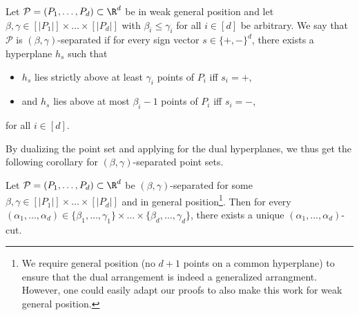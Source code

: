 %
\begin{definition}
    Let $\mathcal{P} = (P_1, \dots, P_d ) \subset \R^d$ be in weak general position and let $\beta, \gamma \in [|P_1|] \times \dots \times [|P_d|]$ with $\beta_i \leq \gamma_i$ for all $i \in [d]$ be arbitrary. We say that $\mathcal{P}$ is $(\beta, \gamma)$-separated if for every sign vector $s \in \{+, -\}^d$, there exists a hyperplane $h_s$ such that 
    \begin{itemize}
        \item $h_s$ lies strictly above at least $\gamma_i$ points of $P_i$ iff $s_i = +$, 
        \item and $h_s$ lies above at most $\beta_i - 1$ points of $P_i$ iff $s_i = -$, 
    \end{itemize}
    for all $i \in [d]$.
\end{definition}
%
By dualizing the point set and applying  for the dual hyperplanes, we thus get the following corollary for $(\beta, \gamma)$-separated point sets.
%
\begin{corollary}
    Let $\mathcal{P} = (P_1, \dots, P_d ) \subset \R^d$ be $(\beta, \gamma)$-separated for some $\beta, \gamma \in [|P_1|] \times \dots \times [|P_d|]$ and in general position\footnote{We require general position (no $d + 1$ points on a common hyperplane) to ensure that the dual arrangement is indeed a generalized arrangment. However, one could easily adapt our proofs to also make this work for weak general position.}. Then for every $(\alpha_1, \dots, \alpha_d) \in \{\beta_1,\ldots,\gamma_1\} \times \dots \times \{\beta_d,\ldots,\gamma_d\}$, there exists a unique $(\alpha_1, \dots, \alpha_d)$-cut.
\end{corollary}
%
